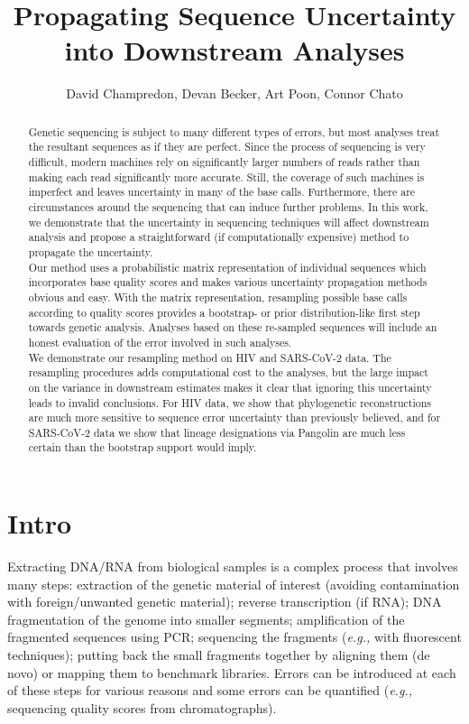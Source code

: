 \documentclass[
]{article}
\title{Propagating Sequence Uncertainty into Downstream Analyses}
\author{David Champredon, Devan Becker, Art Poon, Connor Chato}
\date{}
\newcommand{\eg}{\textit{e.g.,}\xspace}
\begin{document}
\maketitle
\begin{abstract}
Genetic sequencing is subject to many different types of errors, but
most analyses treat the resultant sequences as if they are perfect.
Since the process of sequencing is very difficult, modern machines rely
on significantly larger numbers of reads rather than making each read
significantly more accurate. Still, the coverage of such machines is
imperfect and leaves uncertainty in many of the base calls. Furthermore,
there are circumstances around the sequencing that can induce further
problems. In this work, we demonstrate that the uncertainty in
sequencing techniques will affect downstream analysis and propose a
straightforward (if computationally expensive) method to propagate the
uncertainty.\\
Our method uses a probabilistic matrix representation of individual
sequences which incorporates base quality scores and makes various
uncertainty propagation methods obvious and easy. With the matrix
representation, resampling possible base calls according to quality
scores provides a bootstrap- or prior distribution-like first step
towards genetic analysis. Analyses based on these re-sampled sequences
will include an honest evaluation of the error involved in such
analyses.\\
We demonstrate our resampling method on HIV and SARS-CoV-2 data. The
resampling procedures adds computational cost to the analyses, but the
large impact on the variance in downstream estimates makes it clear that
ignoring this uncertainty leads to invalid conclusions. For HIV data, we
show that phylogenetic reconstructions are much more sensitive to
sequence error uncertainty than previously believed, and for SARS-CoV-2
data we show that lineage designations via Pangolin are much less
certain than the bootstrap support would imply.
\end{abstract}

\hypertarget{intro}{%
\section{Intro}\label{intro}}

Extracting DNA/RNA from biological samples is a complex process that
involves many steps: extraction of the genetic material of interest
(avoiding contamination with foreign/unwanted genetic material); reverse
transcription (if RNA); DNA fragmentation of the genome into smaller
segments; amplification of the fragmented sequences using PCR;
sequencing the fragments (\eg with fluorescent techniques); putting back
the small fragments together by aligning them (de novo) or mapping them
to benchmark libraries. Errors can be introduced at each of these steps
for various reasons
\citep[\citet{oraweAccountingUncertaintyDNA2015}]{beerenwinkelUltradeepSequencingAnalysis2011}
and some errors can be quantified (\eg sequencing quality scores from
chromatographs).
\end{document}
